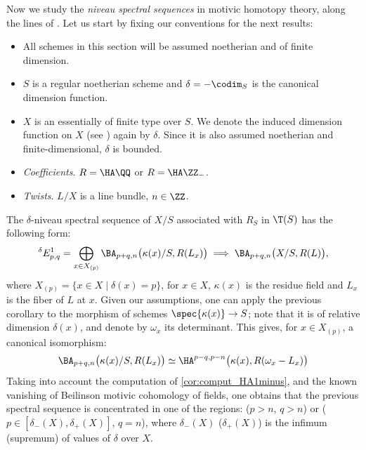 \label{num:coniveau}
Now we study the \emph{niveau spectral sequences} in motivic homotopy theory, along the lines of \cite[\S 3.1]{BD1}.
Let us start by fixing our conventions for the next results:
\begin{itemize}
\item All schemes in this section will be assumed noetherian and of finite dimension.
\item $S$ is a regular noetherian scheme and $\delta=-\codim_S$ is the canonical dimension function.
\item $X$ is an essentially of finite type over $S$.
We denote the induced dimension function on $X$ (see \cite[1.1.7]{BD1}) again by $\delta$.
Since it is also assumed noetherian and finite-dimensional, $\delta$ is bounded.
\item \emph{Coefficients}. $R=\HA \QQ$ or $R=\HA \ZZ_-$.
\item \emph{Twists}.
$L/X$ is a line bundle, $n \in \ZZ$.
\end{itemize}

The $\delta$-niveau spectral sequence of $X/S$ associated with $R_S$ in $\T(S)$
has the following form:
\begin{equation*}\label{eq:nivss}
{}^\delta E^1_{p,q}=\bigoplus_{x \in X_{(p)}} \BA_{p+q,n}\big(\kappa(x)/S,R(L_x)\big) \implies \BA_{p+q,n}\big(X/S,R(L)\big),
\end{equation*}
where $X_{(p)}=\{x \in X \mid \delta(x)=p\}$, for $x \in X$, $\kappa(x)$ is the residue field and $L_x$ is the fiber of $L$ at $x$.
Given our assumptions, one can apply the previous corollary to
the morphism of schemes $\spec{\kappa(x)} \to S$; note that it is of relative dimension $\delta(x)$,
and denote by $\omega_x$ its determinant. This gives, for $x \in X_{(p)}$, a canonical isomorphism:
\begin{equation*}
\BA_{p+q,n}\big(\kappa(x)/S,R(L_x)\big) \simeq \HA^{p-q,p-n}\big(\kappa(x),R(\omega_x-L_x)\big)
\end{equation*}
Taking into account the computation of \eqref{cor:comput_HA1minus}, and the known vanishing of Beilinson motivic cohomology
of fields, one obtains that the previous spectral sequence is concentrated in one of the regions: ($p>n$, $q>n$)
or ($p \in [\delta_-(X),\delta_+(X)]$, $q=n$), where $\delta_-(X)$ (\resp $\delta_+(X)$) is the infimum (\resp supremum) of values of $\delta$ over $X$.

